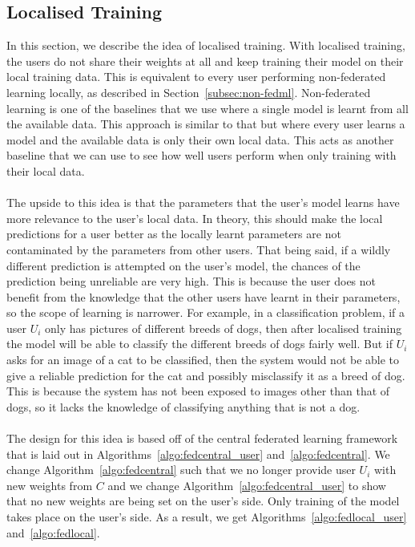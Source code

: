 \documentclass[12pt]{article}
\begin{document}
\subsection{Localised Training} %
In this section, we describe the idea of localised training. With localised training, the users do not share their weights at all and keep training their model on their local training data. This is equivalent to every user performing non-federated learning locally, as described in Section~\ref{subsec:non-fedml}. Non-federated learning is one of the baselines that we use where a single model is learnt from all the available data. This approach is similar to that but where every user learns a model and the available data is only their own local data. This acts as another baseline that we can use to see how well users perform when only training with their local data.
\\\\
The upside to this idea is that the parameters that the user's model learns have more relevance to the user's local data. In theory, this should make the local predictions for a user better as the locally learnt parameters are not contaminated by the parameters from other users. That being said, if a wildly different prediction is attempted on the user's model, the chances of the prediction being unreliable are very high. This is because the user does not benefit from the knowledge that the other users have learnt in their parameters, so the scope of learning is narrower. For example, in a classification problem, if a user $U_i$ only has pictures of different breeds of dogs, then after localised training the model will be able to classify the different breeds of dogs fairly well. But if $U_i$ asks for an image of a cat to be classified, then the system would not be able to give a reliable prediction for the cat and possibly misclassify it as a breed of dog. This is because the system has not been exposed to images other than that of dogs, so it lacks the knowledge of classifying anything that is not a dog.
\\\\
The design for this idea is based off of the central federated learning framework that is laid out in Algorithms~\ref{algo:fedcentral_user} and~\ref{algo:fedcentral}. We change Algorithm~\ref{algo:fedcentral} such that we no longer provide user $U_i$ with new weights from $C$ and we change Algorithm~\ref{algo:fedcentral_user} to show that no new weights are being set on the user's side. Only training of the model takes place on the user's side. As a result, we get Algorithms~\ref{algo:fedlocal_user} and~\ref{algo:fedlocal}.
\end{document}
